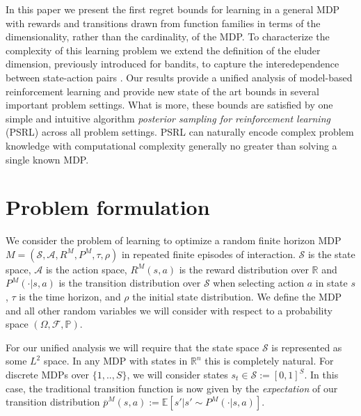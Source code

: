 \documentclass{article}
\newcommand{\Exp}{\mathds{E}}
\newcommand{\Real}{\mathds{R}}
\newcommand{\Sc}{\mathcal{S}}
\newcommand{\Ac}{\mathcal{A}}
\begin{document}
In this paper we present the first regret bounds for learning in a general MDP with rewards and transitions drawn from function families in terms of the dimensionality, rather than the cardinality, of the MDP.
To characterize the complexity of this learning problem we extend the definition of the eluder dimension, previously introduced for bandits, to capture the interedependence between state-action pairs \cite{russo2013eluder}.
Our results provide a unified analysis of model-based reinforcement learning and provide new state of the art bounds in several important problem settings.
What is more, these bounds are satisfied by one simple and intuitive algorithm \emph{posterior sampling for reinforcement learning} (PSRL) \cite{thompson1933,strens2000bayesian,osband2013more} across all problem settings.
PSRL can naturally encode complex problem knowledge with computational complexity generally no greater than solving a single known MDP.


\section{Problem formulation}

We consider the problem of learning to optimize a random finite horizon MDP $M = (\Sc, \Ac, R^M, P^M, \tau, \rho)$ in repeated finite episodes of interaction.
$\Sc$ is the state space, $\Ac$ is the action space, $R^M(s,a)$ is the reward distribution over $\Real$ and $P^M(\cdot|s,a)$ is the transition distribution over $\Sc$ when selecting action $a$ in state $s$, $\tau$ is the time horizon, and $\rho$ the initial state distribution.
We define the MDP and all other random variables we will consider with respect to a probability space $(\Omega, \mathscr{F}, \mathbb{P})$.

For our unified analysis we will require that the state space $\Sc$ is represented as some $L^2$ space.
In any MDP with states in $\Real^n$ this is completely natural.
For discrete MDPs over $\{1,..,S\}$, we will consider states $s_t \in \Sc := [0,1]^S$.
In this case, the traditional transition function is now given by the \emph{expectation} of our transition distribution $\overline{p}^M(s,a) := \Exp \left[s' | s' \sim P^M(\cdot|s,a)\right]$.
\end{document}
